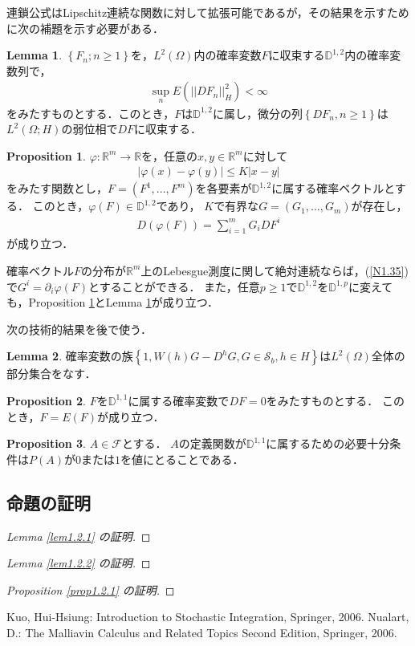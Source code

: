 \documentclass[a4paper,10pt]{jsarticle}
\theoremstyle{definition}
\newtheorem{lemma}{Lemma}
\newtheorem{proposition}{Proposition}
\newcommand{\eq}[1]{\begin{align}#1\end{align}}
\begin{document}
連鎖公式はLipschitz連続な関数に対して拡張可能であるが，その結果を示すために次の補題を示す必要がある．
\begin{lemma}\label{lem1.2.3}
$\left\{F_n;n\ge1\right\}$を，$L^2(\Omega)$内の確率変数$F$に収束する$\mathbb{D}^{1,2}$内の確率変数列で，
\eq{\sup_nE\left(||DF_n||^2_H\right)<\infty}
をみたすものとする．このとき，$F$は$\mathbb{D}^{1,2}$に属し，微分の列$\left\{DF_n,n\ge1\right\}$は$L^2(\Omega;H)$の弱位相で$DF$に収束する．
\end{lemma}
\begin{proposition}\label{prop1.2.4}
$\varphi:\mathbb{R}^m\rightarrow\mathbb{R}$を，任意の$x,y\in\mathbb{R}^m$に対して
\eq{|\varphi(x)-\varphi(y)|\le K|x-y|}
をみたす関数とし，$F=(F^1,...,F^m)$を各要素が$\mathbb{D}^{1,2}$に属する確率ベクトルとする．
このとき，$\varphi(F)\in\mathbb{D}^{1,2}$であり，
$K$で有界な$G=(G_1,...,G_m)$が存在し，
\eq{D\left(\varphi(F)\right)=\sum^m_{i=1}G_iDF^i\label{N1.35}}
が成り立つ．
\end{proposition}
確率ベクトル$F$の分布が$\mathbb{R}^m$上のLebesgue測度に関して絶対連続ならば，(\ref{N1.35})で$G^i=\partial_i\varphi(F)$とすることができる．
また，任意$p\ge1$で$\mathbb{D}^{1,2}$を$\mathbb{D}^{1,p}$に変えても，Proposition \ref{prop1.2.4}とLemma \ref{lem1.2.3}が成り立つ．

次の技術的結果を後で使う．
\begin{lemma}\label{lem1.2.4}
確率変数の族$\left\{1,W(h)G-D^hG,G\in\mathcal{S}_b,h\in H\right\}$は$L^2(\Omega)$全体の部分集合をなす．
\end{lemma}

\begin{proposition}\label{prop1.2.5}
$F$を$\mathbb{D}^{1,1}$に属する確率変数で$DF=0$をみたすものとする．
このとき，$F=E(F)$が成り立つ．
\end{proposition}

\begin{proposition}\label{prop1.2.6}
$A\in\mathcal{F}$とする．
$A$の定義関数が$\mathbb{D}^{1,1}$に属するための必要十分条件は$P(A)$が$0$または$1$を値にとることである．
\end{proposition}

\subsection{命題の証明}
\begin{proof}[Lemma \ref{lem1.2.1} の証明]
\end{proof}
\begin{proof}[Lemma \ref{lem1.2.2} の証明]
\end{proof}
\begin{proof}[Proposition \ref{prop1.2.1} の証明]
\end{proof}

\begin{thebibliography}{5}
	 Kuo, Hui-Hsiung: Introduction to Stochastic Integration, Springer, 2006.
	 Nualart, D.: The Malliavin Calculus and Related Topics Second Edition, Springer, 2006.
\end{thebibliography}
\end{document}
